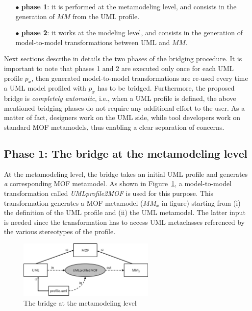 %
\vspace{-.1cm}
\begin{itemize}
	\item[$\bullet$] \textbf{phase 1}: it is performed at the metamodeling level, and consists in the generation of $MM$ from the UML profile.
	\item[$\bullet$] \textbf{phase 2}: it works at the modeling level, and consists in the generation of model-to-model
	transformations between UML and $MM$.
\end{itemize}
%
\vspace{-.2cm}
Next sections describe in details the two phases of the bridging procedure.
It is important to note that phases 1 and 2 are executed only once for each UML profile $p_x$, then generated model-to-model transformations
are re-used every time a UML model profiled with $p_x$ has to be bridged.
Furthermore, the proposed bridge is \textit{completely automatic}, i.e., when a UML profile is defined, the above mentioned bridging phases do not require any additional effort to the user. As a matter of fact, designers work on the UML side, while tool developers work on standard MOF metamodels, thus enabling a clear separation of concerns.

\vspace{-.2cm}
\subsection{Phase 1: The bridge at the metamodeling level}\label{sec:metamodelLevel}

At the metamodeling level, the bridge takes an initial UML profile and generates {\em a} corresponding MOF metamodel.
As shown in Figure~\ref{fig:metamodelingLevel}, a model-to-model transformation called
\textit{UMLprofile2MOF} is used for this purpose. This transformation generates a MOF metamodel ($MM_x$ in figure) starting from (i) the definition of the UML profile and (ii) the UML metamodel. The latter input is needed since the transformation has to access UML metaclasses referenced by the various stereotypes of the profile.
%
\vspace{-.4cm}
\begin{figure}[htbp]
	\centering
		\includegraphics[width=0.60\textwidth]{figures/metamodelingLevel.png}
	\caption{The bridge at the metamodeling level}
	\label{fig:metamodelingLevel}
\end{figure}
\vspace{-.5cm}

